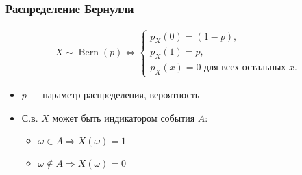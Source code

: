 \documentclass[hyperref=unicode,graphics=pdflatex,13pt,xcolor={usenames,dvipsnames}]{beamer}
\renewcommand\emph[1]{{\color{blue}{#1}}}
\DeclareMathOperator{\Bern}{Bern}
\begin{document}
\begin{frame}
  \frametitle{Распределение Бернулли}
  \begin{align*}
    X \sim \Bern(p) \Leftrightarrow \begin{cases}
      p_X(0) = (1 - p), \\
      p_X(1) = p, \\
      p_X(x) = 0 \text{ для всех остальных } x. 
    \end{cases}
  \end{align*}

  \pause
  \begin{itemize}
    \item $p$ --- параметр распределения, вероятность \emph{успеха}
    \item С.в. $X$ может быть индикатором события $A$:
    \begin{itemize}
      \item $\omega \in A \Rightarrow X(\omega) = 1$
      \item $\omega \notin A \Rightarrow X(\omega) = 0$
    \end{itemize}
  \end{itemize}
    \begin{center}
    \end{center}
\end{frame}
\end{document}
